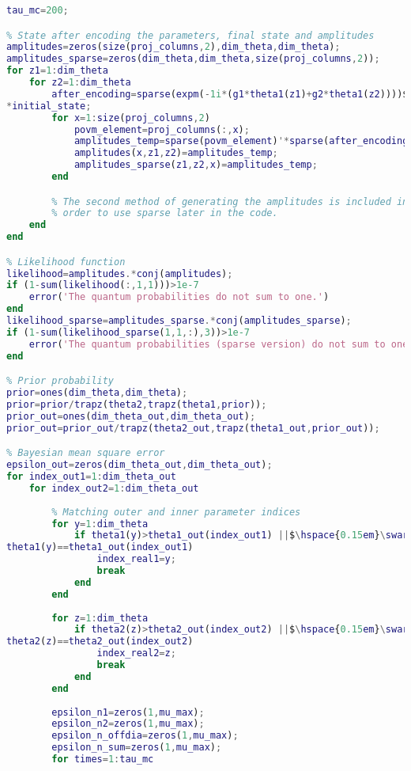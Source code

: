 \begin{lstlisting}[language=Matlab, mathescape=true]
% Monte Carlo sample size
tau_mc=200; 

% State after encoding the parameters, final state and amplitudes
amplitudes=zeros(size(proj_columns,2),dim_theta,dim_theta);
amplitudes_sparse=zeros(dim_theta,dim_theta,size(proj_columns,2));
for z1=1:dim_theta
    for z2=1:dim_theta
        after_encoding=sparse(expm(-1i*(g1*theta1(z1)+g2*theta1(z2))))$\hspace{0.15em}\swarrow$
*initial_state;
        for x=1:size(proj_columns,2)
            povm_element=proj_columns(:,x);     
            amplitudes_temp=sparse(povm_element)'*sparse(after_encoding);
            amplitudes(x,z1,z2)=amplitudes_temp;
            amplitudes_sparse(z1,z2,x)=amplitudes_temp;
        end

        % The second method of generating the amplitudes is included in 
        % order to use sparse later in the code.
    end
end

% Likelihood function
likelihood=amplitudes.*conj(amplitudes);
if (1-sum(likelihood(:,1,1)))>1e-7
    error('The quantum probabilities do not sum to one.')
end
likelihood_sparse=amplitudes_sparse.*conj(amplitudes_sparse);
if (1-sum(likelihood_sparse(1,1,:),3))>1e-7
    error('The quantum probabilities (sparse version) do not sum to one.')
end

% Prior probability
prior=ones(dim_theta,dim_theta);
prior=prior/trapz(theta2,trapz(theta1,prior));
prior_out=ones(dim_theta_out,dim_theta_out);
prior_out=prior_out/trapz(theta2_out,trapz(theta1_out,prior_out));

% Bayesian mean square error
epsilon_out=zeros(dim_theta_out,dim_theta_out);
for index_out1=1:dim_theta_out
    for index_out2=1:dim_theta_out
        
        % Matching outer and inner parameter indices       
        for y=1:dim_theta
            if theta1(y)>theta1_out(index_out1) ||$\hspace{0.15em}\swarrow$
theta1(y)==theta1_out(index_out1)
                index_real1=y;
                break
            end
        end
        
        for z=1:dim_theta
            if theta2(z)>theta2_out(index_out2) ||$\hspace{0.15em}\swarrow$
theta2(z)==theta2_out(index_out2)
                index_real2=z;
                break
            end
        end
        
        epsilon_n1=zeros(1,mu_max);
        epsilon_n2=zeros(1,mu_max);
        epsilon_n_offdia=zeros(1,mu_max);
        epsilon_n_sum=zeros(1,mu_max);
        for times=1:tau_mc
            

\end{lstlisting}
